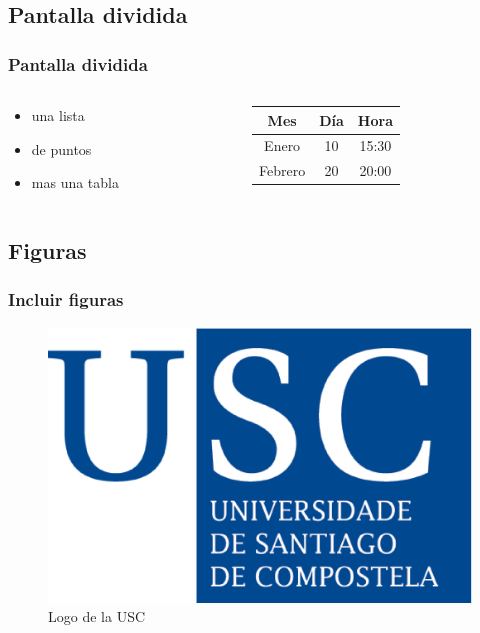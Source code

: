 \documentclass{beamer}
\begin{document}
\subsection{Pantalla dividida}

\begin{frame}
\frametitle{Pantalla dividida}
\begin{columns}
\begin{column}{5cm}
\begin{itemize}
\item una lista
\item de puntos 
\item mas una tabla 
\end{itemize}
\end{column}
\begin{column}{5cm}
\begin{tabular}{|c|c|c|} \hline
\textbf{Mes} & \textbf{Día} & \textbf{Hora} \\ \hline
Enero   & 10 & 15:30 \\ \hline
Febrero & 20 & 20:00 \\ \hline
\end{tabular}
\end{column}
\end{columns}
\end{frame}

\subsection{Figuras} 
\begin{frame}
\frametitle{Incluir figuras}
\begin{figure}
\includegraphics[scale=0.3]{images/logo_usc.eps} 
\caption{Logo de la USC}
\end{figure}
\end{frame}
\end{document}
